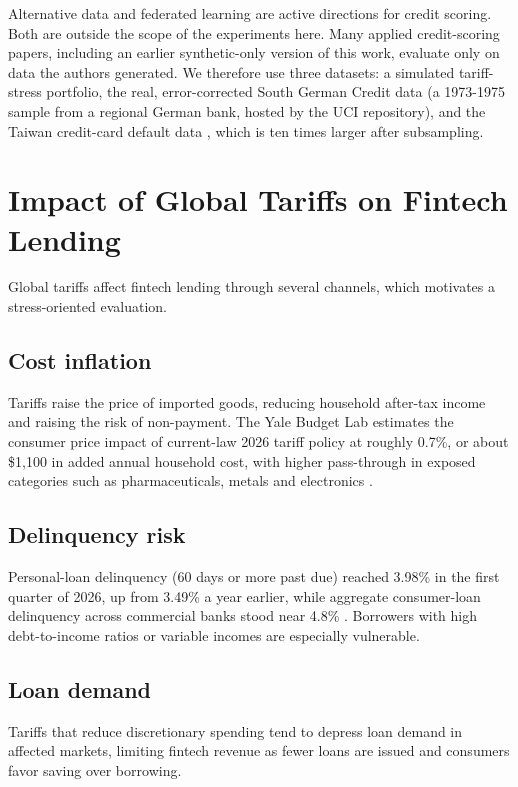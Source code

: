 \documentclass[conference,a4paper]{IEEEtran}
\begin{document}
Alternative data \cite{r8} and federated learning \cite{r6} are active directions for credit scoring. Both are outside the scope of the experiments here. Many applied credit-scoring papers, including an earlier synthetic-only version of this work, evaluate only on data the authors generated. We therefore use three datasets: a simulated tariff-stress portfolio, the real, error-corrected South German Credit data \cite{r21,r22} (a 1973-1975 sample from a regional German bank, hosted by the UCI repository), and the Taiwan credit-card default data \cite{r31}, which is ten times larger after subsampling.

\section{Impact of Global Tariffs on Fintech Lending}

Global tariffs affect fintech lending through several channels, which motivates a stress-oriented evaluation.

\subsection{Cost inflation}

Tariffs raise the price of imported goods, reducing household after-tax income and raising the risk of non-payment. The Yale Budget Lab estimates the consumer price impact of current-law 2026 tariff policy at roughly 0.7\%, or about \$1,100 in added annual household cost, with higher pass-through in exposed categories such as pharmaceuticals, metals and electronics \cite{r9}.

\subsection{Delinquency risk}

Personal-loan delinquency (60 days or more past due) reached 3.98\% in the first quarter of 2026, up from 3.49\% a year earlier, while aggregate consumer-loan delinquency across commercial banks stood near 4.8\% \cite{r10,r11,r12}. Borrowers with high debt-to-income ratios or variable incomes are especially vulnerable.

\subsection{Loan demand}

Tariffs that reduce discretionary spending tend to depress loan demand in affected markets, limiting fintech revenue as fewer loans are issued and consumers favor saving over borrowing.
\end{document}
